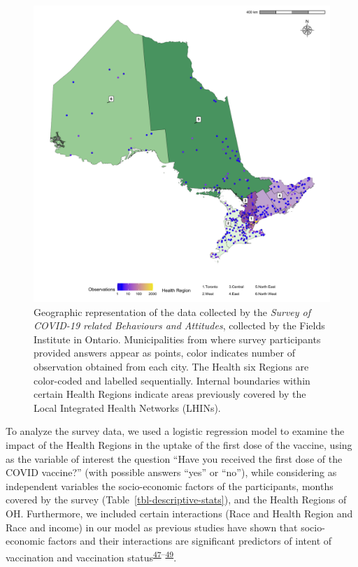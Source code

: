 \documentclass[
]{article}
\begin{document}
\begin{figure}

{\centering \includegraphics[width=1\textwidth,height=1\textheight]{../data/map_data/map_June_01.pdf}

}

\caption{\label{fig-map}Geographic representation of the data collected
by the \emph{Survey of COVID-19 related Behaviours and Attitudes},
collected by the Fields Institute in Ontario. Municipalities from where
survey participants provided answers appear as points, color indicates
number of observation obtained from each city. The Health six Regions
are color-coded and labelled sequentially. Internal boundaries within
certain Health Regions indicate areas previously covered by the Local
Integrated Health Networks (LHINs).}

\end{figure}

To analyze the survey data, we used a logistic regression model to
examine the impact of the Health Regions in the uptake of the first dose
of the vaccine, using as the variable of interest the question ``Have
you received the first dose of the COVID vaccine?'' (with possible
answers ``yes'' or ``no''), while considering as independent variables
the socio-economic factors of the participants, months covered by the
survey (Table~\ref{tbl-descriptive-stats}), and the Health Regions of
OH. Furthermore, we included certain interactions (Race and Health
Region and Race and income) in our model as previous studies have shown
that socio-economic factors and their interactions are significant
predictors of intent of vaccination and vaccination
status\textsuperscript{\protect\hyperlink{ref-nguyen2022}{47}--\protect\hyperlink{ref-cnat2022a}{49}}.
\end{document}
